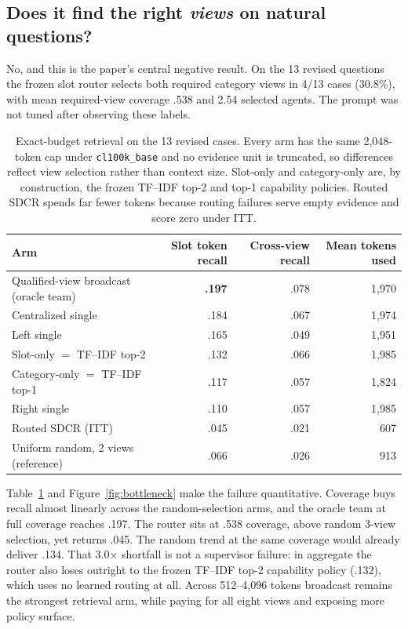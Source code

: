 \documentclass{article}
\begin{document}
\subsection{Does it find the right \emph{views} on natural questions?}
No, and this is the paper's central negative result. On the 13 revised questions the frozen slot router selects both required category views in 4/13 cases (30.8\%), with mean required-view coverage .538 and 2.54 selected agents. The prompt was not tuned after observing these labels.

\begin{table}[t]
\centering
\caption{Exact-budget retrieval on the 13 revised cases. Every arm has the same 2,048-token cap under \texttt{cl100k\_base} and no evidence unit is truncated, so differences reflect view selection rather than context size. Slot-only and category-only are, by construction, the frozen TF--IDF top-2 and top-1 capability policies. Routed SDCR spends far fewer tokens because routing failures serve empty evidence and score zero under ITT.}
\label{tab:retrieval}
\small
\begin{tabular}{lrrr}
\toprule
Arm & Slot token recall & Cross-view recall & Mean tokens used\\
\midrule
Qualified-view broadcast (oracle team) & \textbf{.197} & .078 & 1{,}970\\
Centralized single & .184 & .067 & 1{,}974\\
Left single & .165 & .049 & 1{,}951\\
Slot-only $=$ TF--IDF top-2 & .132 & .066 & 1{,}985\\
Category-only $=$ TF--IDF top-1 & .117 & .057 & 1{,}824\\
Right single & .110 & .057 & 1{,}985\\
Routed SDCR (ITT) & .045 & .021 & 607\\
\midrule
Uniform random, 2 views (reference) & .066 & .026 & 913\\
\bottomrule
\end{tabular}
\end{table}

Table~\ref{tab:retrieval} and Figure~\ref{fig:bottleneck} make the failure quantitative. Coverage buys recall almost linearly across the random-selection arms, and the oracle team at full coverage reaches .197. The router sits at .538 coverage, above random 3-view selection, yet returns .045. The random trend at the same coverage would already deliver .134. That 3.0$\times$ shortfall is not a supervisor failure: in aggregate the router also loses outright to the frozen TF--IDF top-2 capability policy (.132), which uses no learned routing at all. Across 512--4,096 tokens broadcast remains the strongest retrieval arm, while paying for all eight views and exposing more policy surface.
\end{document}

